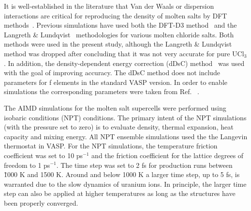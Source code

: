 \documentclass[titlepage=firstiscover,11pt,fleqn,headheight=14pt,footheight=40.8pt]{scrreprt}
\begin{document}
It is well-established in the literature that Van der Waals or dispersion interactions are critical for reproducing the density of molten salts by DFT methods~\cite{Li,Nam2014,Nam2015}. Previous simulations have used both the DFT-D3 method~\cite{Li,Grimme} and the Langreth \& Lundqvist~\cite{Nam2015,Dion,Klimes} methodologies for various molten chloride salts. Both methods were used in the present study, although the Langreth \& Lundqvist method was dropped after concluding that it was not very accurate for pure UCl$_3$. %
In addition, the density-dependent energy correction (dDsC) method~\cite{Steinmann2011,Steinmann2} was used with the goal of improving accuracy. The dDsC method does not include parameters for f elements in the standard VASP version. In order to enable simulations the corresponding parameters were taken from Ref. ~\cite{Kim}. 

The AIMD simulations for the molten salt supercells were performed using isobaric conditions (NPT) conditions. The primary intent of the NPT simulations (with the pressure set to zero) is to evaluate density, thermal expansion, heat capacity and mixing energy. All NPT ensemble simulations used the the Langevin thermostat in VASP. 
For the NPT simulations, the temperature friction coefficient was set to 10 ps$^{-1}$ and the friction coefficient for the lattice degrees of freedom to 1 ps$^{-1}$. The time step was set to 2 fs for production runs between \~1000 K and 1500 K. Around and below 1000 K a larger time step, up to 5 fs, is warranted due to the slow dynamics of uranium ions. In principle, the larger time step can also be applied at higher temperatures as long as the structures have been properly converged. 
\end{document}
